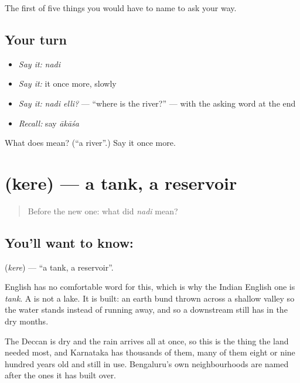 \begin{grammarlens}[title={What you've built}]
The first of five things you would have to name to ask your way.
\end{grammarlens}

\subsection*{Your turn}
\begin{itemize}
\raggedright
  \item \emph{Say it:} \emph{nadi}
  \item \emph{Say it:} it once more, slowly
  \item \emph{Say it:} \emph{nadi elli?} — \textquotedblleft{}where is the river?\textquotedblright{} — with the asking word at the end
  \item \emph{Recall:} say \emph{ākāśa}
\end{itemize}

\begin{tcolorbox}[breakable,colback=teal!4,colframe=teal!35!black,title={Before you move on}]
What does  mean? (\textquotedblleft{}a river\textquotedblright{}.) Say it once more.
\end{tcolorbox}
\section[\texorpdfstring{\kn{ಕೆರೆ} (kere)}{ಕೆರೆ (kere)}]{ (kere) — a tank, a reservoir}

\label{lesson:KA-C55-tank}



\begin{quote}
Before the new one: what did \emph{nadi} mean?
\end{quote}

\subsection*{You'll want to know: }
\textbf{} (\emph{kere}) — \textquotedblleft{}a tank, a reservoir\textquotedblright{}.

English has no comfortable word for this, which is why the Indian English one is \emph{tank}. A  is not a lake. It is built: an earth bund thrown across a shallow valley so the  water stands instead of running away, and so a  downstream still has  in the dry months.

The Deccan is dry and the rain arrives all at once, so this is the thing the land needed most, and Karnataka has thousands of them, many of them eight or nine hundred years old and still in use. Bengaluru's own neighbourhoods are named after the ones it has built over.

